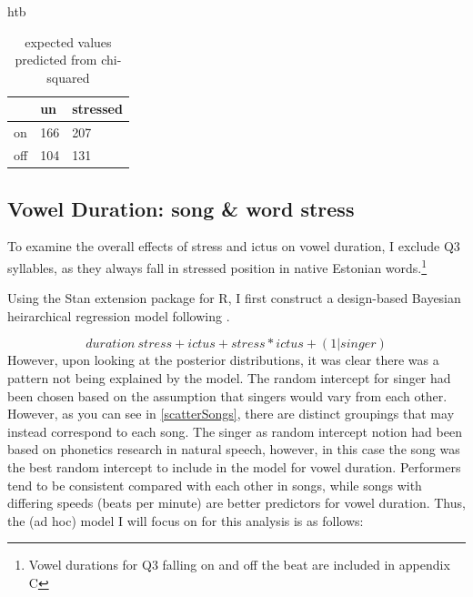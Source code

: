 \begin{table}{htb}
\caption{expected values predicted from chi-squared}
\centering
\begin{tabular}{lll}
\hline
 				& un 		&   stressed \\
\hline
on	& 166 	& 207 \\
off   				&   104	 & 131 \\
\hline
\end{tabular}
\label{chipredict}
\end{table}



\subsection{Vowel Duration: song \& word stress} 
To examine the overall effects of stress and ictus on vowel duration, I exclude Q3 syllables, as they always fall in stressed position in native Estonian words.\footnote{Vowel durations for Q3 falling on and off the beat are included in appendix C} 

Using the \citep{goodrichRstanarmBayesianApplied2020} Stan extension package for R, I first construct a design-based Bayesian heirarchical regression model following \cite{heirarchyOne}. 

\begin{equation}
duration ~ stress + ictus + stress*ictus + (1|singer)
\end{equation} 
However, upon looking at the posterior distributions, it was clear there was a pattern not being explained by the model. The random intercept for singer had been chosen based on the assumption that singers would vary from each other. However, as you can see in \ref{scatterSongs}, there are distinct groupings that may instead correspond to each song. The singer as random intercept notion had been based on phonetics research in natural speech, however, in this case the song was the best random intercept to include in the model for vowel duration. Performers tend to be consistent compared with each other in songs, while songs with differing speeds (beats per minute) are better predictors for vowel duration. Thus, the (ad hoc) model I will focus on for this analysis is as follows: 

